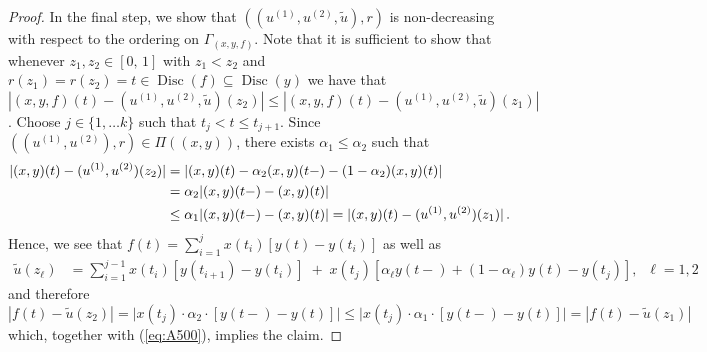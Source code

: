 \documentclass[11pt]{article}
\theoremstyle{definition}\newtheorem{example}[theorem]{Example}
\theoremstyle{definition}\newtheorem{counterexample}[theorem]{Counterexample}
\theoremstyle{definition}\newtheorem{remark}[theorem]{Remark}
\theoremstyle{definition}\newtheorem{defi}[theorem]{Definition}
\numberwithin{equation}{section}
\renewcommand{\|}{\; : \, \;}											%
\begin{document}
\begin{proof}
	In the final step, we show that $((u^{(1)}, u^{(2)},\tilde{u}),r)$ is non-decreasing with respect to the ordering on $\Gamma_{(x,y,f)}$. Note that it is sufficient to show that whenever $z_1,z_2 \in [0,\,1]$ with $z_1 < z_2$ and $r(z_1) = r(z_2) = t \in \operatorname{Disc}(f) \subseteq \operatorname{Disc}(y)$ we have that 
	$|(x,y,f)(t) - (u^{(1)}, u^{(2)},\tilde{u})(z_2)| \leq|(x,y,f)(t) - (u^{(1)}, u^{(2)},\tilde{u})(z_1)|$. Choose $j \in \{1,\ldots k\}$ such that $t_j < t\leq t_{j+1}$. Since $((u^{(1)},u^{(2)}),r) \in \Pi((x,y))$, there exists $\alpha_1 \leq \alpha_2$ such that
	\begin{align}
		|(x,y)(t) - (u^{(1)},u^{(2)})(z_2)| &= |(x,y)(t) - \alpha_2 (x,y)(t-) - (1 - \alpha_2)(x,y)(t)| \notag\\
		&= \alpha_2 |(x,y)(t-) - (x,y)(t)| \notag \\
		&\leq \alpha_1 |(x,y)(t-) - (x,y)(t)| = |(x,y)(t) - (u^{(1)},u^{(2)})(z_1)| \, . \label{eq:A500}
	\end{align}
	Hence, we see that $f(t) = \sum_{i=1}^j x(t_i)  [y(t) - y(t_i)]$ as well as 
	\begin{align*}
		\tilde{u}(z_\ell) &= \sum_{i=1}^{j-1} x(t_i) \left[y(t_{i+1}) - y(t_i)\right] \; + \; x(t_j)  \left[\alpha_\ell y(t-) + (1-\alpha_\ell)y(t) - y(t_j)\right] , \;\;\ell=1,2
	\end{align*}
	and therefore 
	$$ |f(t) - \tilde{u}(z_2)|  =  \bigl|x(t_j) \cdot \alpha_2 \cdot [y(t-) - y(t)]\bigr| \leq \bigl|x(t_j) \cdot \alpha_1 \cdot [y(t-) - y(t)]\bigr| = |f(t) - \tilde{u}(z_1)| $$
	which, together with (\ref{eq:A500}), implies the claim.
\end{proof}
\end{document}
